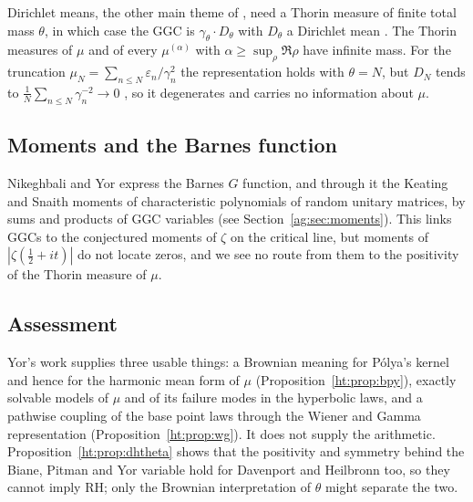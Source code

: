 Dirichlet means, the other main theme of \cite{JRY}, need a Thorin measure of finite total mass $\theta$, in which case the GGC is $\gamma_\theta\cdot D_\theta$ with $D_\theta$ a Dirichlet mean \cite[(31) to (35)]{JRY}. %
The Thorin measures of $\mu$ and of every $\mu^{(\alpha)}$ with $\alpha\ge\sup_\rho\Re\rho$ have infinite mass. For the truncation $\mu_N=\sum_{n\le N}\varepsilon_n/\gamma_n^2$ the representation holds with $\theta=N$, but $D_N$ tends to $\frac1N\sum_{n\le N}\gamma_n^{-2}\to0$ \cite[Proposition 1.7]{JRY}, %
so it degenerates and carries no information about $\mu$.

\subsection{Moments and the Barnes function}
Nikeghbali and Yor \cite{NY09} express the Barnes $G$ function, and through it the Keating and Snaith moments of characteristic polynomials of random unitary matrices, by sums and products of GGC variables (see Section~\ref{ag:sec:moments}). This links GGCs to the conjectured moments of $\zeta$ on the critical line, but moments of $|\zeta(\frac12+it)|$ do not locate zeros, and we see no route from them to the positivity of the Thorin measure of $\mu$.

\subsection{Assessment}
Yor's work supplies three usable things: a Brownian meaning for P\'olya's kernel and hence for the harmonic mean form of $\mu$ (Proposition~\ref{ht:prop:bpy}), exactly solvable models of $\mu$ and of its failure modes in the hyperbolic laws, and a pathwise coupling of the base point laws through the Wiener and Gamma representation (Proposition~\ref{ht:prop:wg}). It does not supply the arithmetic. Proposition~\ref{ht:prop:dhtheta} shows that the positivity and symmetry behind the Biane, Pitman and Yor variable hold for Davenport and Heilbronn too, so they cannot imply RH; only the Brownian interpretation of $\theta$ might separate the two.

